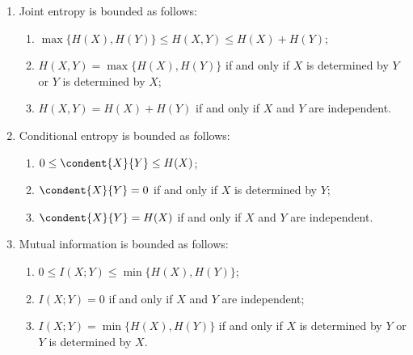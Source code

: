 \begin{propn}
\begin{enumerate}
\item 
{}
Joint entropy is bounded as follows:
\begin{enumerate}
\item 
$\max\{H(X), H(Y)\} \leq H(X, Y) \leq H(X) + H(Y)$;

\item
$H(X, Y) = \max\{H(X), H(Y)\}$ if and only if $X$ is determined by $Y$ or
  $Y$ is determined by $X$;

\item
$H(X, Y) = H(X) + H(Y)$ if and only if $X$ and $Y$ are independent.
\end{enumerate}

\item
{}
Conditional entropy is bounded as follows:
% 
\begin{enumerate}
\item 
$0 \leq \condent{X}{Y} \leq H(X)$;

\item
$\condent{X}{Y} = 0$ if and only if $X$ is determined by $Y$;

\item
$\condent{X}{Y} = H(X)$ if and only if $X$ and $Y$ are independent.
\end{enumerate}

\item
{}
Mutual information is bounded as follows:
% 
\begin{enumerate}
\item 
$0 \leq I(X; Y) \leq \min \{H(X), H(Y)\}$;

\item
$I(X; Y) = 0$ if and only if $X$ and $Y$ are independent;

\item
$I(X; Y) = \min \{H(X), H(Y)\}$ if and only if $X$ is determined by $Y$ or
  $Y$ is determined by $X$.
\end{enumerate}
\end{enumerate}
\end{propn}

